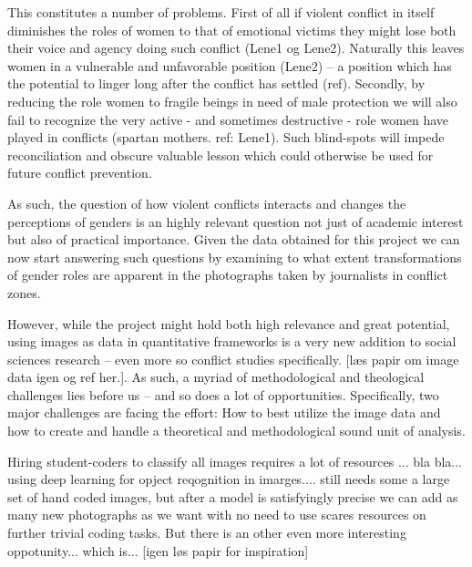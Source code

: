 \documentclass[a4paper]{article}
\begin{document}
This constitutes a number of problems. First of all if violent conflict in itself diminishes the roles of women to that of emotional victims they might lose both their voice and agency doing such conflict (Lene1 og Lene2). Naturally this leaves women in a vulnerable and unfavorable position (Lene2) -- a position which has the potential to linger long after the conflict has settled (ref). Secondly, by reducing the role women to fragile beings in need of male protection we will also fail to recognize the very active - and sometimes destructive - role women have played in conflicts (spartan mothers. ref: Lene1). Such blind-spots will impede reconciliation and obscure valuable lesson which could otherwise be used for future conflict prevention.\par

As such, the question of how violent conflicts interacts and changes the perceptions of genders is an highly relevant question not just of academic interest but also of practical importance. Given the data obtained for this project we can now start answering such questions by examining to what extent transformations of gender roles are apparent in the photographs taken by journalists in conflict zones.\par

However, while the project might hold both high relevance and great potential, using images as data in quantitative frameworks is a very new addition to social sciences research -- even more so conflict studies specifically. [læs papir om image data igen og ref her.]. As such, a myriad of methodological and theological challenges lies before us -- and so does a lot of opportunities. Specifically, two major challenges are facing the effort: How to best utilize the image data and how to create and handle a theoretical and methodological sound unit of analysis.\par\par



Hiring student-coders to classify all images requires a lot of resources ... bla bla... using deep learning for opject reqognition in imarges.... still needs some a large set of hand coded images, but after a model is satisfyingly precise we can add as many new photographs as we want with no need to use scares resources on further trivial coding tasks. But there is an other even more interesting oppotunity... which is... [igen løs papir for inspiration]
\end{document}
